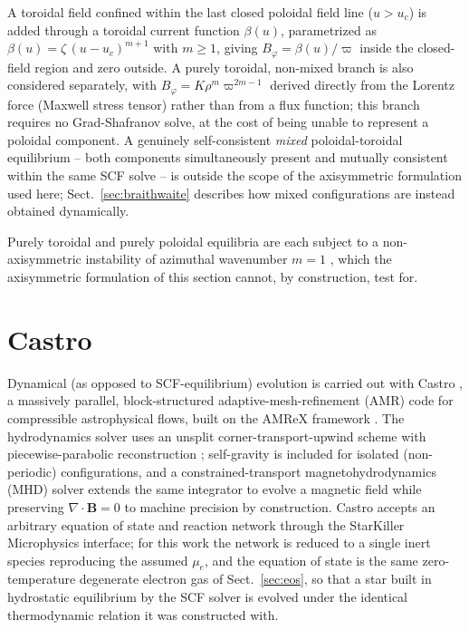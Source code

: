 \documentclass{aa}
\begin{document}
A toroidal field confined within the last closed poloidal field line
($u > u_c$) is added through a toroidal current function $\beta(u)$,
parametrized as $\beta(u) = \zeta\,(u-u_c)^{m+1}$ with $m\ge1$, giving
$B_\varphi = \beta(u)/\varpi$ inside the closed-field region and zero
outside. A purely toroidal, non-mixed branch is also considered
separately, with $B_\varphi = K\rho^m\varpi^{2m-1}$ derived directly
from the Lorentz force (Maxwell stress tensor) rather than from a flux
function; this branch requires no Grad-Shafranov solve, at the cost of
being unable to represent a poloidal component. A genuinely
self-consistent \emph{mixed} poloidal-toroidal equilibrium -- both
components simultaneously present and mutually consistent within the
same SCF solve -- is outside the scope of the axisymmetric formulation
used here; Sect.~\ref{sec:braithwaite} describes how mixed
configurations are instead obtained dynamically.

Purely toroidal and purely poloidal equilibria are each subject to a
non-axisymmetric instability of azimuthal wavenumber $m=1$
\citep{tayler1973,markey1973}, which the axisymmetric formulation of
this section cannot, by construction, test for.


\section{Castro}
\label{sec:castro}

Dynamical (as opposed to SCF-equilibrium) evolution is carried out with
Castro \citep{castro}, a massively parallel, block-structured
adaptive-mesh-refinement (AMR) code for compressible astrophysical
flows, built on the AMReX framework \citep{AMReX}. The hydrodynamics
solver uses an unsplit corner-transport-upwind scheme \citep{ctu} with
piecewise-parabolic reconstruction \citep{ppm}; self-gravity is
included for isolated (non-periodic) configurations, and a
constrained-transport magnetohydrodynamics (MHD) solver extends the
same integrator to evolve a magnetic field while preserving
$\nabla\!\cdot\!\mathbf{B}=0$ to machine precision by construction.
Castro accepts an arbitrary equation of state and reaction network
through the StarKiller Microphysics interface; for this work the
network is reduced to a single inert species reproducing the assumed
$\mu_e$, and the equation of state is the same zero-temperature
degenerate electron gas of Sect.~\ref{sec:eos}, so that a star built in
hydrostatic equilibrium by the SCF solver is evolved under the
identical thermodynamic relation it was constructed with.
\end{document}

